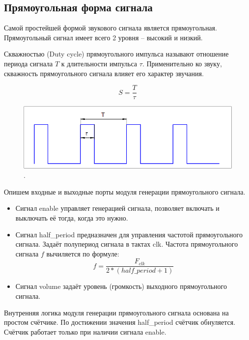 \subsection{Прямоугольная форма сигнала}

Самой простейшей формой звукового сигнала является прямоугольная. Прямоугольный сигнал имеет всего 2 уровня -- высокий и низкий. 


Скважностью (Duty cycle) прямоугольного импульса называют отношение периода сигнала $T$ к длительности импульса $\tau$. Применительно ко звуку, скважность прямоугольного сигнала влияет его характер звучания.

$$ S = \frac{T}{\tau} $$


\begin{figure}[H]
	\centering
	\includegraphics [width=1\textwidth] {images/lab_7/duty_cycle.png}
	\caption{.}
	\label{lab7:pic4}
\end{figure}


Опишем входные и выходные порты модуля генерации прямоугольного сигнала.

\noindent
\begin{minipage}{\linewidth}
	
\end{minipage}

\begin{itemize}
	\item Сигнал enable управляет генерацией сигнала, позволяет включать и выключать её тогда, когда это нужно.
	\item Сигнал half\_period предназначен для управления частотой прямоугольного сигнала. Задаёт полупериод сигнала в тактах clk. Частота прямоугольного сигнала $f$ вычиляется по формуле: 
	$$ f = \frac{F_{clk}}{2* (half\_period + 1)} $$
	\item Сигнал volume задаёт уровень (громкость) выходного прямоугольного сигнала.

\end{itemize}


Внутренняя логика модуля генерации прямоугольного сигнала основана на простом счётчике. По достижении значения half\_period счётчик обнуляется. Счётчик работает только при наличии сигнала enable.

